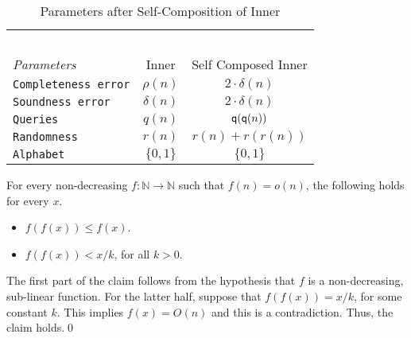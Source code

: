  \begin{table}[h]
\centering 
\begin{tabular}{|l|c|c|}
  \hline 
  \ & & \\
  {\em Parameters}  &{\sc Inner} & \parbox{1.65in} {\sc Self Composed Inner}  \\
  \hline
  \hline
  {\tt Completeness error} & $\rho(n)$ & $2 \cdot \delta(n)$  \\  
  {\tt Soundness error} &  $\delta(n)$ & $2 \cdot \delta(n)$   \\
  {\tt Queries} &   $q(n)$ & ${\sf q}({\sf q}(n))$  \\
  {\tt Randomness}&  $r(n)$ & $r(n) + r(r(n))$  \\ 
  {\tt Alphabet} & $\{0,1\}$  & $\{0,1\}$ \\
\hline
\end{tabular} %
 \caption{Parameters after Self-Composition of Inner} \label{table:selfcompose}
\end{table}



\begin{claim}\label{dying}
  For every non-decreasing $f : \mathbb{N} \rightarrow \mathbb{N}$
  such that $f(n) = o(n)$, the following holds for every $x$.
\begin{itemize}
\item $f\left(f\left(x\right)\right) \le f(x)$.
\item $f\left(f\left(x\right)\right) <  x/k$, for all $k > 0$.
\end{itemize}
\end{claim}
 The first part of the claim follows from the
hypothesis that $f$ is a non-decreasing, sub-linear function. For the
latter half, suppose that $f\left(f\left(x\right)\right) = x/k$, for
some constant $k$. This implies $f(x) = O(n)$ and this is a
contradiction. Thus, the claim holds.\qed



